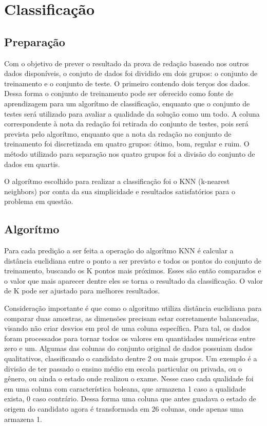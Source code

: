 \documentclass[12pt]{article}
\begin{document}
\section{Classificação}
\subsection{Preparação}
Com o objetivo de prever o resultado da prova de redação baseado nos outros dados disponíveis, o conjuto de dados foi
dividido em dois grupos: o conjunto de treinamento e o conjunto de teste. O primeiro contendo dois terços dos dados. Dessa
forma o conjunto de treinamento pode ser oferecido como fonte de aprendizagem para um algorítmo de classificação, enquanto
que o conjunto de testes será utilizado para avaliar a qualidade da solução como um todo. A coluna correspondente à nota
da redação foi retirada do conjunto de testes, pois será prevista pelo algorítmo, enquanto que a nota da redação no conjunto
de treinamento foi discretizada em quatro grupos: ótimo, bom, regular e ruim. O método utilizado para separação nos
quatro grupos foi a divisão do conjunto de dados em quartis.

O algorítmo escolhido para realizar a classificação foi o KNN (k-nearest neighbors) por conta da sua simplicidade e
resultados satisfatórios para o problema em questão.

\subsection{Algorítmo}
Para cada predição a ser feita a operação do algorítmo KNN é calcular a distância euclidiana entre o ponto a ser previsto
e todos os pontos do conjunto de treinamento, buscando os K pontos mais próximos. Esses são então comparados e o valor que
mais aparecer dentre eles se torna o resultado da classificação. O valor de K pode ser ajustado para melhores resultados.

Consideração importante é que como o algoritmo utiliza distância euclidiana para comparar duas amostras, as dimensões
precisam estar corretamente balanceadas, visando não criar desvios em prol de uma coluna específica. Para tal, os dados
foram processados para tornar todos os valores em quantidades numéricas entre zero e um. Algumas das colunas do conjunto
original de dados possuiam dados qualitativos, classificando o candidato dentre 2 ou mais grupos. Um exemplo é a divisão
de ter passado o ensino médio em escola particular ou privada, ou o gênero, ou ainda o estado onde realizou o exame. Nesse
caso cada qualidade foi em uma coluna com característica boleana, que armazena 1 caso a qualidade exista, 0 caso contrário.
Dessa forma uma coluna que antes guadava o estado de origem do candidato agora é transformada em 26 colunas, onde apenas
uma armazena 1.
\end{document}
